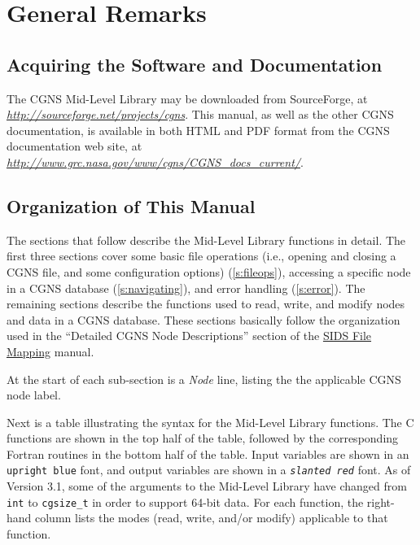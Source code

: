 \section{General Remarks}
\label{s:general}
\thispagestyle{plain}

\subsection{Acquiring the Software and Documentation}

The CGNS Mid-Level Library may be downloaded from SourceForge, at
{\itshape\url{http://sourceforge.net/projects/cgns}}.
This manual, as well as the other CGNS documentation, is available in
both HTML and PDF format from the CGNS documentation web site, at
{\itshape\url{http://www.grc.nasa.gov/www/cgns/CGNS_docs_current/}}.

\subsection{Organization of This Manual}

The sections that follow describe the Mid-Level Library functions
in detail.
The first three sections cover some basic file operations (i.e.,
opening and closing a CGNS file, and some configuration options)
(\autoref{s:fileops}), accessing a specific node in a CGNS database
(\autoref{s:navigating}), and error handling (\autoref{s:error}).
The remaining sections describe the functions used to read, write, and
modify nodes and data in a CGNS database.
These sections basically follow the organization used in
the ``Detailed CGNS Node Descriptions'' section of the
\href{../filemap/filemap.pdf}{SIDS File Mapping} manual.

At the start of each sub-section is a \textit{Node} line, listing the
the applicable CGNS node label.

Next is a table illustrating the syntax for the Mid-Level Library
functions.
The C functions are shown in the top half of the table, followed by the
corresponding Fortran routines in the bottom half of the table.
Input variables are shown in an \textcolor{input}{\texttt{upright blue}}
font, and output variables are shown in a
\textcolor{output}{\texttt{\textit{slanted red}}} font.
As of Version 3.1, some of the arguments to the Mid-Level Library have
changed from \texttt{int} to \texttt{cgsize\_t} in order to support 64-bit data.
For each function, the right-hand column lists the modes (read, write,
and/or modify) applicable to that function.

